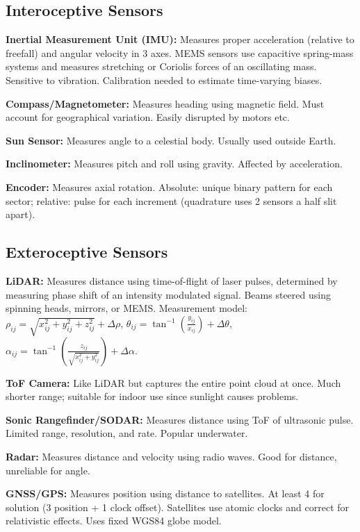 \documentclass[twocolumn, 8pt]{extarticle}
\begin{document}
\subsection{Interoceptive Sensors}

\textbf{Inertial Measurement Unit (IMU):} Measures proper acceleration (relative to freefall) and angular velocity in 3
axes. MEMS sensors use capacitive spring-mass systems and measures stretching or Coriolis forces of an oscillating mass.
Sensitive to vibration. Calibration needed to estimate time-varying biases.

\textbf{Compass/Magnetometer:} Measures heading using magnetic field. Must account for geographical variation.
Easily disrupted by motors etc.

\textbf{Sun Sensor:} Measures angle to a celestial body. Usually used outside Earth.

\textbf{Inclinometer:} Measures pitch and roll using gravity. Affected by acceleration.

\textbf{Encoder:} Measures axial rotation. Absolute: unique binary pattern for each sector; relative: pulse for each
increment (quadrature uses 2 sensors a half slit apart).

\subsection{Exteroceptive Sensors}

\textbf{LiDAR:} Measures distance using time-of-flight of laser pulses, determined by measuring phase shift of an
intensity modulated signal. Beams steered using spinning heads, mirrors, or MEMS. Measurement model:
\(\displaystyle \rho _{ij} = \sqrt{x_{ij}^2 + y_{ij}^2 + z_{ij}^2} + \Delta\rho\),
\(\displaystyle \theta _{ij} = \tan^{-1}\left(\frac{y_{ij}}{x_{ij}}\right) + \Delta\theta\),
\(\displaystyle \alpha _{ij} = \tan^{-1}\left(\frac{z_{ij}}{\sqrt{x_{ij}^2 + y_{ij}^2}}\right) + \Delta\alpha\).

\textbf{ToF Camera:} Like LiDAR but captures the entire point cloud at once. Much shorter range; suitable for indoor
use since sunlight causes problems.

\textbf{Sonic Rangefinder/SODAR:} Measures distance using ToF of ultrasonic pulse. Limited range, resolution, and rate.
Popular underwater.

\textbf{Radar:} Measures distance and velocity using radio waves. Good for distance, unreliable for angle.

\textbf{GNSS/GPS:} Measures position using distance to satellites. At least 4 for solution (3 position + 1 clock
offset). Satellites use atomic clocks and correct for relativistic effects. Uses fixed WGS84 globe model.
\end{document}
